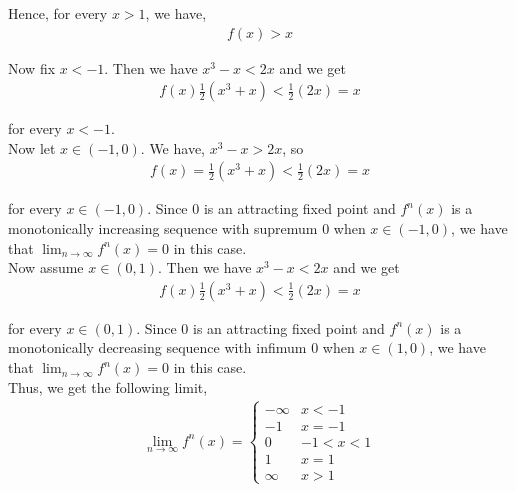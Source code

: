 \documentclass[12pt]{article}
\begin{document}
Hence, for every $x > 1$, we have,
\begin{align*}
f(x) > x
\end{align*}

Now fix $x < -1$. Then we have $x^3 - x < 2x$ and we get
\begin{align*}
f(x) \frac{1}{2} (x^3 + x) < \frac{1}{2} (2x) = x
\end{align*}

for every $x < -1$.\\

Now let $x \in (-1, 0)$. We have, $x^3 - x > 2x$, so 
\begin{align*}
f(x) = \frac{1}{2} (x^3 + x) < \frac{1}{2} (2x) = x
\end{align*}

for every $x \in (-1, 0)$. Since $0$ is an attracting fixed point and $f^n(x)$ is a monotonically increasing sequence with supremum $0$ when $x \in (-1, 0)$, we have that $\lim_{n \to \infty} f^n(x) = 0$ in this case.\\

Now assume $x \in (0, 1)$. Then we have $x^3 - x < 2x$ and we get 
\begin{align*}
f(x) \frac{1}{2} (x^3 + x) < \frac{1}{2} (2x) = x
\end{align*}

for every $x \in (0, 1)$. Since $0$ is an attracting fixed point and $f^n(x)$ is a monotonically decreasing sequence with infimum $0$ when $x \in (1, 0)$, we have that $\lim_{n \to \infty} f^n(x) = 0$ in this case.\\

Thus, we get the following limit,
\begin{align*}
\lim_{n \to \infty} f^n(x) = \begin{cases} 
      -\infty & x < -1 \\
      -1 & x = -1\\
      0 & -1 < x < 1 \\
      1 & x = 1\\
      \infty & x > 1 
   \end{cases}
\end{align*}
\end{document}
